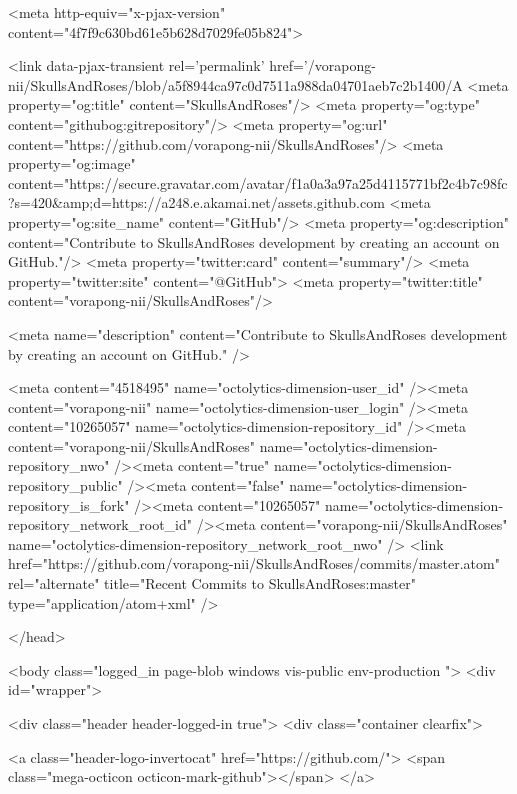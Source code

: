       <meta http-equiv="x-pjax-version" content="4f7f9c630bd61e5b628d7029fe05b824">

        <link data-pjax-transient rel='permalink' href='/vorapong-nii/SkullsAndRoses/blob/a5f8944ca97c0d7511a988da04701aeb7c2b1400/A%
    <meta property="og:title" content="SkullsAndRoses"/>
    <meta property="og:type" content="githubog:gitrepository"/>
    <meta property="og:url" content="https://github.com/vorapong-nii/SkullsAndRoses"/>
    <meta property="og:image" content="https://secure.gravatar.com/avatar/f1a0a3a97a25d4115771bf2c4b7c98fc?s=420&amp;d=https://a248.e.akamai.net/assets.github.com%
    <meta property="og:site_name" content="GitHub"/>
    <meta property="og:description" content="Contribute to SkullsAndRoses development by creating an account on GitHub."/>
    <meta property="twitter:card" content="summary"/>
    <meta property="twitter:site" content="@GitHub">
    <meta property="twitter:title" content="vorapong-nii/SkullsAndRoses"/>

    <meta name="description" content="Contribute to SkullsAndRoses development by creating an account on GitHub." />


    <meta content="4518495" name="octolytics-dimension-user_id" /><meta content="vorapong-nii" name="octolytics-dimension-user_login" /><meta content="10265057" name="octolytics-dimension-repository_id" /><meta content="vorapong-nii/SkullsAndRoses" name="octolytics-dimension-repository_nwo" /><meta content="true" name="octolytics-dimension-repository_public" /><meta content="false" name="octolytics-dimension-repository_is_fork" /><meta content="10265057" name="octolytics-dimension-repository_network_root_id" /><meta content="vorapong-nii/SkullsAndRoses" name="octolytics-dimension-repository_network_root_nwo" />
  <link href="https://github.com/vorapong-nii/SkullsAndRoses/commits/master.atom" rel="alternate" title="Recent Commits to SkullsAndRoses:master" type="application/atom+xml" />

  </head>


  <body class="logged_in page-blob windows vis-public env-production  ">
    <div id="wrapper">

      
      
      

      <div class="header header-logged-in true">
  <div class="container clearfix">

    <a class="header-logo-invertocat" href="https://github.com/">
  <span class="mega-octicon octicon-mark-github"></span>
</a>

